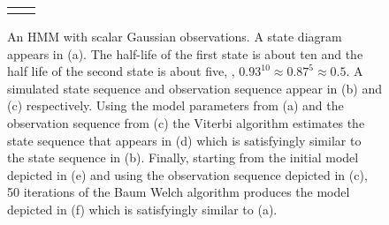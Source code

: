 \begin{figure}[htbp]
{\begin{tabular}[H]{cc}
{        }
      \end{tabular}}
  \caption[An HMM with scalar Gaussian observations.]%
  {An HMM with scalar Gaussian observations.  A state diagram appears in
    (a).  The half-life of the first state is about ten and the half
    life of the second state is about five, \ie, $0.93^{10} \approx
    0.87^5 \approx 0.5$.  A simulated state sequence and observation
    sequence appear in (b) and (c) respectively.  Using the model
    parameters from (a) and the observation sequence from (c) the
    Viterbi algorithm estimates the state sequence that appears in (d)
    which is satisfyingly similar to the state sequence in (b).
    Finally, starting from the initial model depicted in (e) and using
    the observation sequence depicted in (c), 50 iterations of the
    Baum Welch algorithm produces the model depicted in (f) which is
    satisfyingly similar to (a).}
  \label{fig:ScalarGaussian}
\end{figure}

